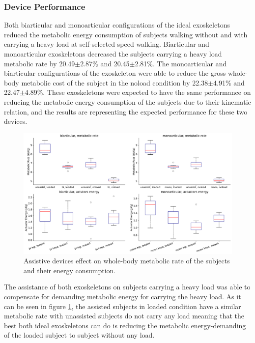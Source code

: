 \documentclass[10pt,letterpaper]{article}
\begin{document}
\subsubsection*{Device Performance}
Both biarticular and monoarticular configurations of the ideal exoskeletons reduced the metabolic energy consumption of subjects walking without and with carrying a heavy load at self-selected speed walking. Biarticular and monoarticular exoskeletons decreased the subjects carrying a heavy load metabolic rate by 20.49$\pm$2.87\% and 20.45$\pm$2.81\%. The monoarticular and biarticular configurations of the exoskeleton were able to reduce the gross whole-body metabolic cost of the subject in the noload condition by 22.38$\pm$4.91\% and 22.47$\pm$4.89\%. These exoskeletons were expected to have the same performance on reducing the metabolic energy consumption of the subjects due to their kinematic relation, and the results are representing the expected performance for these two devices.\\
\begin{figure}[ht]   
	\centering
	\includegraphics[scale=0.35]{Ideal_Exo_MonovsBi_Figures/Paper_Figure_Energy_BoxPlot.pdf}
	\caption{Assistive devices effect on whole-body metabolic rate of the subjects and their energy consumption.}
	\label{Fig_IdealExo_Energy_BoxPlot}
\end{figure}
The assistance of both exoskeletons on subjects carrying a heavy load was able to compensate for demanding metabolic energy for carrying the heavy load. As it can be seen in figure \ref{Fig_IdealExo_Energy_BoxPlot}, the assisted subjects in loaded condition have a similar metabolic rate with unassisted subjects do not carry any load meaning that the best both ideal exoskeletons can do is reducing the metabolic energy-demanding of the loaded subject to subject without any load.\\
\end{document}
